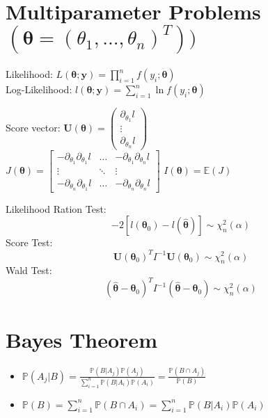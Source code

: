 \documentclass[a4paper]{article}
\begin{document}
\section*{Multiparameter Problems $(\pmb{\theta} = (\theta_1,...,\theta_n)^T))$}
\begin{multicols}{2}
	\begin{center}
		Likelihood: $L(\pmb{\theta;\mathbf{y}}) = \prod_{i=1}^n f(y_i; \pmb{\theta})$\\
		Log-Likelihood: $l(\pmb{\theta;\mathbf{y}}) = \sum_{i=1}^n \ln f(y_i; \pmb{\theta})$\\
	\end{center}
\end{multicols}
\begin{multicols}{2}
	\begin{center}
		Score vector: $\mathbf{U}(\pmb{\theta}) = \begin{pmatrix} \partial_{\theta_1}l \\ \vdots \\ \partial_{\theta_n}l \end{pmatrix}$\\
		$J(\pmb{\theta}) = \begin{bmatrix} 
			-\partial_{\theta_1}\partial_{\theta_1}l & \hdots & -\partial_{\theta_1}\partial_{\theta_n}l\\
			\vdots & \ddots & \vdots \\
			-\partial_{\theta_n}\partial_{\theta_1}l & \hdots & -\partial_{\theta_n}\partial_{\theta_n}l
		\end{bmatrix}$\quad
		$I(\pmb{\theta}) = \mathbb{E}(J)$
	\end{center}
\end{multicols}
Likelihood Ration Test: $$-2[l(\pmb{\theta}_0) - l(\hat{\pmb{\theta}})] \sim \chi _n^2(\alpha)$$
Score Test: $$\mathbf{U}(\pmb{\theta}_0)^T I^{-1} \mathbf{U}(\pmb{\theta}_0) \sim \chi_n^2(\alpha)$$
Wald Test: $$(\hat{\pmb{\theta}} - \pmb{\theta}_0)^T I^{-1} (\hat{\pmb{\theta}} - \pmb{\theta}_0) \sim \chi_n^2(\alpha)$$

\section*{Bayes Theorem}
	\begin{itemize}
		\item $\mathbb{P}(A_j|B) = \frac{\mathbb{P}(B|A_j)\mathbb{P}(A_j)}{\sum_{i=1}^n\mathbb{P}(B|A_i)\mathbb{P}(A_i)} = \frac{\mathbb{P}(B \cap A_j)}{\mathbb{P}(B)}$
		\item $\mathbb{P}(B) = \sum_{i=1}^n \mathbb{P}(B \cap A_i) = \sum_{i=1}^n \mathbb{P}(B | A_i)\mathbb{P}(A_i)$
	\end{itemize}
\end{document}
